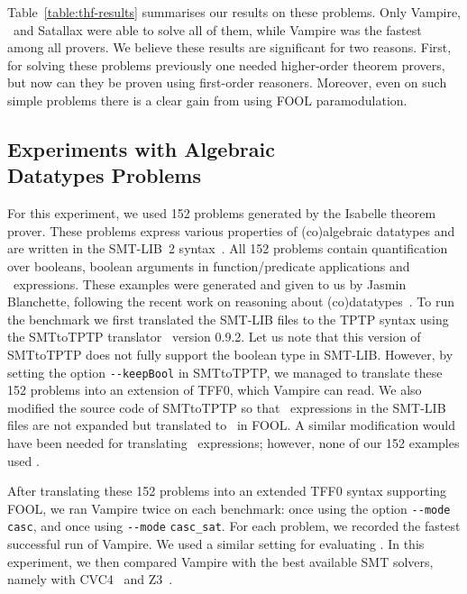 Table~\ref{table:thf-results} summarises our results on these problems. Only Vampire, \nofoolVampire\ and Satallax were able to solve all of them, while
Vampire was the fastest among all provers. We believe these results
are significant for two reasons. First, for solving these problems
previously one 
needed higher-order theorem provers, but now can they be proven using first-order reasoners. Moreover, even on such simple problems there is a clear gain from using FOOL paramodulation.


\subsection[Experiments with Algebraic Datatypes Problems]{Experiments with Algebraic\\Datatypes Problems}
\label{subsec:Isabelle}

For this experiment, we used 152 problems generated by the Isabelle theorem prover. These
problems express various properties of (co)algebraic datatypes and are written in the SMT-LIB~2 syntax~\cite{SMT-LIB}. All 152 problems contain quantification over booleans, boolean arguments in function/predicate applications and \ITE\ expressions. These examples were generated and given to us by Jasmin Blanchette, following the recent work on reasoning about (co)datatypes~\cite{Blanchette15}. To run the benchmark we first translated the SMT-LIB files to the TPTP syntax using the SMTtoTPTP translator~\cite{SMTLIB2TPTP} version 0.9.2.
Let us note that this version of SMTtoTPTP does not fully support the
boolean type in SMT-LIB. However, by setting the option
\verb'--keepBool' in SMTtoTPTP, we managed to translate these 152
problems into an extension of TFF0, which Vampire can read.
We also modified the source code of  SMTtoTPTP so that  \ITE\
expressions in the SMT-LIB files are not expanded but translated to \dite\
in FOOL. A similar modification would have been needed for translating
\LETIN\ expressions; however, none of our 152 examples used \LETIN.

After translating these 152 problems into an extended TFF0 syntax
supporting FOOL, we ran Vampire twice on each benchmark: once using the
option \verb'--mode casc', and once using
\verb'--mode' \verb'casc_sat'.  For each problem, we recorded the
fastest successful run of Vampire. We used a similar setting for
evaluating \nofoolVampire.
In this experiment, we then compared Vampire with
the best available SMT solvers, namely with CVC4~\cite{CVC4} and
Z3~\cite{Z3}.

